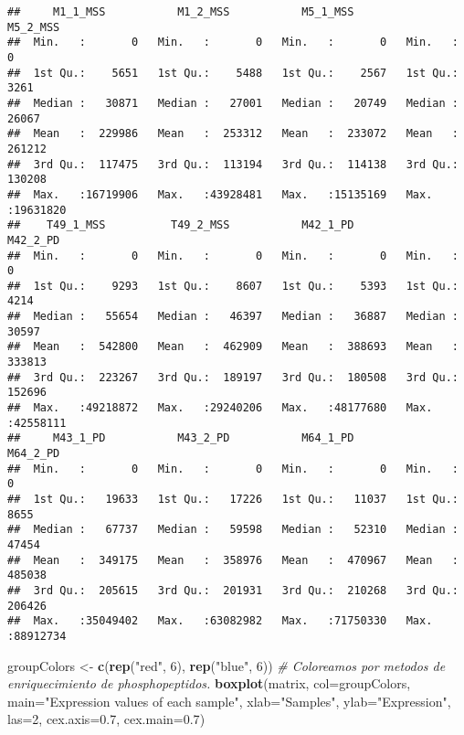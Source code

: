 \documentclass[
]{article}
\newenvironment{Shaded}{\begin{snugshade}}{\end{snugshade}}
\newcommand{\AttributeTok}[1]{\textcolor[rgb]{0.13,0.29,0.53}{#1}}
\newcommand{\CommentTok}[1]{\textcolor[rgb]{0.56,0.35,0.01}{\textit{#1}}}
\newcommand{\DecValTok}[1]{\textcolor[rgb]{0.00,0.00,0.81}{#1}}
\newcommand{\FloatTok}[1]{\textcolor[rgb]{0.00,0.00,0.81}{#1}}
\newcommand{\FunctionTok}[1]{\textcolor[rgb]{0.13,0.29,0.53}{\textbf{#1}}}
\newcommand{\NormalTok}[1]{#1}
\newcommand{\OtherTok}[1]{\textcolor[rgb]{0.56,0.35,0.01}{#1}}
\newcommand{\StringTok}[1]{\textcolor[rgb]{0.31,0.60,0.02}{#1}}
\begin{document}
\begin{verbatim}
##     M1_1_MSS           M1_2_MSS           M5_1_MSS           M5_2_MSS       
##  Min.   :       0   Min.   :       0   Min.   :       0   Min.   :       0  
##  1st Qu.:    5651   1st Qu.:    5488   1st Qu.:    2567   1st Qu.:    3261  
##  Median :   30871   Median :   27001   Median :   20749   Median :   26067  
##  Mean   :  229986   Mean   :  253312   Mean   :  233072   Mean   :  261212  
##  3rd Qu.:  117475   3rd Qu.:  113194   3rd Qu.:  114138   3rd Qu.:  130208  
##  Max.   :16719906   Max.   :43928481   Max.   :15135169   Max.   :19631820  
##    T49_1_MSS          T49_2_MSS           M42_1_PD           M42_2_PD       
##  Min.   :       0   Min.   :       0   Min.   :       0   Min.   :       0  
##  1st Qu.:    9293   1st Qu.:    8607   1st Qu.:    5393   1st Qu.:    4214  
##  Median :   55654   Median :   46397   Median :   36887   Median :   30597  
##  Mean   :  542800   Mean   :  462909   Mean   :  388693   Mean   :  333813  
##  3rd Qu.:  223267   3rd Qu.:  189197   3rd Qu.:  180508   3rd Qu.:  152696  
##  Max.   :49218872   Max.   :29240206   Max.   :48177680   Max.   :42558111  
##     M43_1_PD           M43_2_PD           M64_1_PD           M64_2_PD       
##  Min.   :       0   Min.   :       0   Min.   :       0   Min.   :       0  
##  1st Qu.:   19633   1st Qu.:   17226   1st Qu.:   11037   1st Qu.:    8655  
##  Median :   67737   Median :   59598   Median :   52310   Median :   47454  
##  Mean   :  349175   Mean   :  358976   Mean   :  470967   Mean   :  485038  
##  3rd Qu.:  205615   3rd Qu.:  201931   3rd Qu.:  210268   3rd Qu.:  206426  
##  Max.   :35049402   Max.   :63082982   Max.   :71750330   Max.   :88912734
\end{verbatim}

\begin{Shaded}
\begin{Highlighting}[]
\NormalTok{groupColors }\OtherTok{\textless{}{-}} \FunctionTok{c}\NormalTok{(}\FunctionTok{rep}\NormalTok{(}\StringTok{"red"}\NormalTok{, }\DecValTok{6}\NormalTok{), }\FunctionTok{rep}\NormalTok{(}\StringTok{"blue"}\NormalTok{, }\DecValTok{6}\NormalTok{)) }\CommentTok{\# Coloreamos por metodos de enriquecimiento de phosphopeptidos.}
\FunctionTok{boxplot}\NormalTok{(matrix, }\AttributeTok{col=}\NormalTok{groupColors, }\AttributeTok{main=}\StringTok{"Expression values of each sample"}\NormalTok{,}
    \AttributeTok{xlab=}\StringTok{"Samples"}\NormalTok{,}
    \AttributeTok{ylab=}\StringTok{"Expression"}\NormalTok{, }\AttributeTok{las=}\DecValTok{2}\NormalTok{, }\AttributeTok{cex.axis=}\FloatTok{0.7}\NormalTok{, }\AttributeTok{cex.main=}\FloatTok{0.7}\NormalTok{)}
\end{Highlighting}
\end{Shaded}
\end{document}
